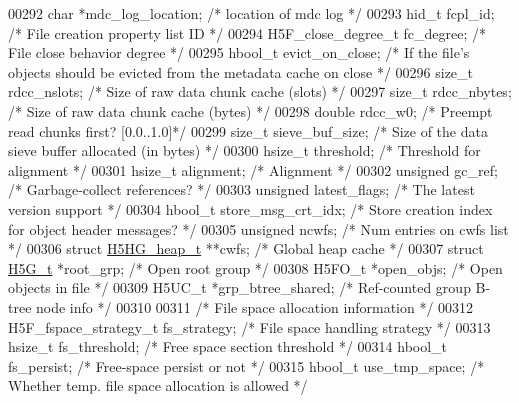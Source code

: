\begin{DoxyCode}
00292     \textcolor{keywordtype}{char}        *mdc\_log\_location; \textcolor{comment}{/* location of mdc log               */}
00293     hid\_t       fcpl\_id;    \textcolor{comment}{/* File creation property list ID   */}
00294     H5F\_close\_degree\_t fc\_degree;   \textcolor{comment}{/* File close behavior degree   */}
00295     hbool\_t evict\_on\_close; \textcolor{comment}{/* If the file's objects should be evicted from the metadata cache on close */}
00296     \textcolor{keywordtype}{size\_t}  rdcc\_nslots;    \textcolor{comment}{/* Size of raw data chunk cache (slots) */}
00297     \textcolor{keywordtype}{size\_t}  rdcc\_nbytes;    \textcolor{comment}{/* Size of raw data chunk cache (bytes) */}
00298     \textcolor{keywordtype}{double}  rdcc\_w0;    \textcolor{comment}{/* Preempt read chunks first? [0.0..1.0]*/}
00299     \textcolor{keywordtype}{size\_t}      sieve\_buf\_size; \textcolor{comment}{/* Size of the data sieve buffer allocated (in bytes) */}
00300     hsize\_t threshold;  \textcolor{comment}{/* Threshold for alignment      */}
00301     hsize\_t alignment;  \textcolor{comment}{/* Alignment                */}
00302     \textcolor{keywordtype}{unsigned}    gc\_ref;     \textcolor{comment}{/* Garbage-collect references?      */}
00303     \textcolor{keywordtype}{unsigned}    latest\_flags;   \textcolor{comment}{/* The latest version support */}
00304     hbool\_t store\_msg\_crt\_idx;  \textcolor{comment}{/* Store creation index for object header messages? */}
00305     \textcolor{keywordtype}{unsigned}    ncwfs;      \textcolor{comment}{/* Num entries on cwfs list     */}
00306     \textcolor{keyword}{struct }\hyperlink{struct_h5_h_g__heap__t}{H5HG\_heap\_t} **cwfs;   \textcolor{comment}{/* Global heap cache            */}
00307     \textcolor{keyword}{struct }\hyperlink{struct_h5_g__t}{H5G\_t} *root\_grp;    \textcolor{comment}{/* Open root group          */}
00308     H5FO\_t *open\_objs;          \textcolor{comment}{/* Open objects in file                 */}
00309     H5UC\_t *grp\_btree\_shared;   \textcolor{comment}{/* Ref-counted group B-tree node info   */}
00310 
00311     \textcolor{comment}{/* File space allocation information */}
00312     H5F\_fspace\_strategy\_t fs\_strategy;      \textcolor{comment}{/* File space handling strategy */}
00313     hsize\_t     fs\_threshold;   \textcolor{comment}{/* Free space section threshold     */}
00314     hbool\_t fs\_persist;                     \textcolor{comment}{/* Free-space persist or not */}
00315     hbool\_t     use\_tmp\_space;  \textcolor{comment}{/* Whether temp. file space allocation is allowed */}

\end{DoxyCode}
